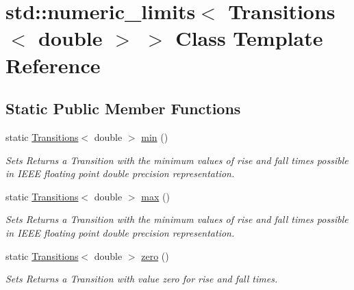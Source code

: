 \hypertarget{classstd_1_1numeric__limits_3_01Transitions_3_01double_01_4_01_4}{\section{std\-:\-:numeric\-\_\-limits$<$ Transitions$<$ double $>$ $>$ Class Template Reference}
\label{classstd_1_1numeric__limits_3_01Transitions_3_01double_01_4_01_4}
}
\subsection*{Static Public Member Functions}
\begin{DoxyCompactItemize}
\item 
static \hyperlink{classTransitions}{Transitions}$<$ double $>$ \hyperlink{classstd_1_1numeric__limits_3_01Transitions_3_01double_01_4_01_4_aaf2bf171cb5f11b864b09798f6d63460}{min} ()
\begin{DoxyCompactList}\small\item\em Sets Returns a Transition with the minimum values of rise and fall times possible in I\-E\-E\-E floating point double precision representation. \end{DoxyCompactList}\item 
static \hyperlink{classTransitions}{Transitions}$<$ double $>$ \hyperlink{classstd_1_1numeric__limits_3_01Transitions_3_01double_01_4_01_4_aac0b30f8990c636cda3f083b95e626a4}{max} ()
\begin{DoxyCompactList}\small\item\em Sets Returns a Transition with the minimum values of rise and fall times possible in I\-E\-E\-E floating point double precision representation. \end{DoxyCompactList}\item 
static \hyperlink{classTransitions}{Transitions}$<$ double $>$ \hyperlink{classstd_1_1numeric__limits_3_01Transitions_3_01double_01_4_01_4_ab17fbee311d6e67204ca678d02ba1e80}{zero} ()
\begin{DoxyCompactList}\small\item\em Sets Returns a Transition with value zero for rise and fall times. \end{DoxyCompactList}\end{DoxyCompactItemize}


